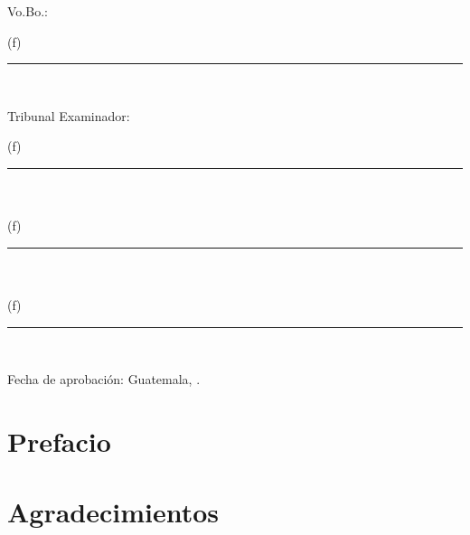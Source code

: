 \documentclass[10pt, letterpaper]{report}
\newcommand{\defaultparformat}[1]{
	{\setlength{\parskip}{2ex}
    }
}
\begin{document}
\ifdefined\CAPfirmas
	\newpage
	\thispagestyle{empty}
	\vspace*{0.5in}
	\large Vo.Bo.:\\[1cm]
	\begin{center}
		(f) \rule[1pt]{4 in}{1pt}\\
		\nombreasesor
	\end{center}
	\vspace{1in}

	Tribunal Examinador:\\[1cm]
	\begin{center}
		(f) \rule[1pt]{4 in}{1pt}\\
		\nombreasesor \\[1in]
		(f) \rule[1pt]{4 in}{1pt}\\
		\nombreprimerex \\[1in]
		(f) \rule[1pt]{4 in}{1pt}\\
		\nombresegundoex
	\end{center}
	\vspace{1in}

	Fecha de aprobación: Guatemala, \fechaaprobacion.
	\normalsize
\fi

\ifdefined\CAPprefacio
	\newpage
	\cleardoublepage{}
    \chapter*{Prefacio}
    \ifdefined\parpordefecto
    	\defaultparformat{prefacio}
    \else
    	
    \fi
\fi

\ifdefined\CAPagradecimientos
	\newpage
    \cleardoublepage{}
	\chapter*{Agradecimientos}
	\ifdefined\parpordefecto
    	\defaultparformat{agradecimientos}
    \else
    	
    \fi 
\fi
\end{document}
